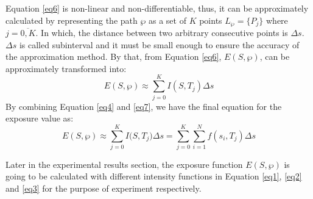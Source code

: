 \documentclass[final]{elsarticle}
\begin{document}
Equation \eqref{eq6} is non-linear and non-differentiable, thus,
it can be approximately calculated by representing the path $\wp $ as a set
of $ K $ points ${L_\wp } = \{ {P_j}\} $ where $j = \overline {0,K} $. In which, the distance between two arbitrary consecutive points is $\Delta s$. $\Delta s$ is called subinterval and it must be small enough to ensure the accuracy of the approximation method. By that, from Equation \eqref{eq6}, $ E(S,\wp ) $, can be approximately transformed into:
\begin{equation}
\label{eq7}
E(S,\wp) \approx \sum\limits_{j = 0}^K {I(S, T_j)\Delta s} 
\end{equation}
By combining Equation \eqref{eq4} and \eqref{eq7}, we have the final equation for the exposure value as:
\begin{equation}
\label{eq8}
E(S,\wp ) \approx \sum\limits_{j = 0}^K {I(S,{T_j}} )\Delta s = \sum\limits_{j = 0}^K {\sum\limits_{i = 1}^N {f({s_i},{T_j})} } \Delta s
\end{equation}

Later in the experimental results section, the exposure function $ E(S,\wp )$ is going to be calculated with different intensity functions in Equation \eqref{eq1}, \eqref{eq2} and \eqref{eq3} for the purpose of experiment respectively. 
\end{document}
